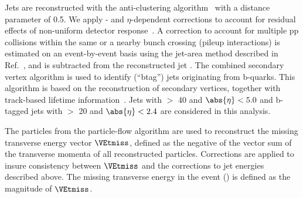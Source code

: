 Jets are reconstructed with the anti-\kt clustering
algorithm~\cite{Cacciari:2008gp} with a distance parameter of 0.5. We apply
\pt- and $\eta$-dependent corrections to account for residual
effects of non-uniform detector response~\cite{Chatrchyan:2011ds}.
A correction to account for multiple pp collisions within the same or a nearby
bunch crossing (pileup interactions) is estimated on an event-by-event basis using the
jet-area method described in Ref.~\cite{cacciari-2008-659}, and is
subtracted from the reconstructed jet \pt.
The combined secondary vertex algorithm is used to identify (``btag'') jets 
originating from b-quarks.  This algorithm 
 is based on the reconstruction of secondary vertices, together with track-based lifetime information~\cite{Chatrchyan:2012jua}. 
Jets with  \PT $>$ 40 \GeV and $\abs{\eta} < 5.0$ and b-tagged jets with \PT $>$ 20 \GeV and $\abs{\eta} < 2.4$ are considered in this analysis.


The particles from the particle-flow algorithm are used to reconstruct the missing transverse energy vector $\VEtmiss$, defined as the negative of the vector sum of the transverse momenta of all reconstructed particles.  Corrections are applied to insure consistency between
$\VEtmiss$ and the corrections to jet energies described above.  The missing transverse energy in the event (\MET) is defined as the magnitude of $\VEtmiss$.



